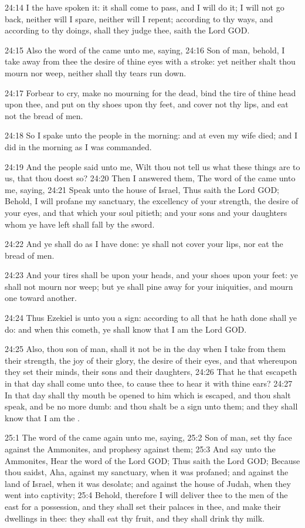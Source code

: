 24:14 I the \LORD have spoken it: it shall come to pass, and I will do
it; I will not go back, neither will I spare, neither will I repent;
according to thy ways, and according to thy doings, shall they judge
thee, saith the Lord GOD.

24:15 Also the word of the \LORD came unto me, saying, 24:16 Son of
man, behold, I take away from thee the desire of thine eyes with a
stroke: yet neither shalt thou mourn nor weep, neither shall thy tears
run down.

24:17 Forbear to cry, make no mourning for the dead, bind the tire of
thine head upon thee, and put on thy shoes upon thy feet, and cover
not thy lips, and eat not the bread of men.

24:18 So I spake unto the people in the morning: and at even my wife
died; and I did in the morning as I was commanded.

24:19 And the people said unto me, Wilt thou not tell us what these
things are to us, that thou doest so?  24:20 Then I answered them, The
word of the \LORD came unto me, saying, 24:21 Speak unto the house of
Israel, Thus saith the Lord GOD; Behold, I will profane my sanctuary,
the excellency of your strength, the desire of your eyes, and that
which your soul pitieth; and your sons and your daughters whom ye have
left shall fall by the sword.

24:22 And ye shall do as I have done: ye shall not cover your lips,
nor eat the bread of men.

24:23 And your tires shall be upon your heads, and your shoes upon
your feet: ye shall not mourn nor weep; but ye shall pine away for
your iniquities, and mourn one toward another.

24:24 Thus Ezekiel is unto you a sign: according to all that he hath
done shall ye do: and when this cometh, ye shall know that I am the
Lord GOD.

24:25 Also, thou son of man, shall it not be in the day when I take
from them their strength, the joy of their glory, the desire of their
eyes, and that whereupon they set their minds, their sons and their
daughters, 24:26 That he that escapeth in that day shall come unto
thee, to cause thee to hear it with thine ears?  24:27 In that day
shall thy mouth be opened to him which is escaped, and thou shalt
speak, and be no more dumb: and thou shalt be a sign unto them; and
they shall know that I am the \LORD.

25:1 The word of the \LORD came again unto me, saying, 25:2 Son of man,
set thy face against the Ammonites, and prophesy against them; 25:3
And say unto the Ammonites, Hear the word of the Lord GOD; Thus saith
the Lord GOD; Because thou saidst, Aha, against my sanctuary, when it
was profaned; and against the land of Israel, when it was desolate;
and against the house of Judah, when they went into captivity; 25:4
Behold, therefore I will deliver thee to the men of the east for a
possession, and they shall set their palaces in thee, and make their
dwellings in thee: they shall eat thy fruit, and they shall drink thy
milk.

